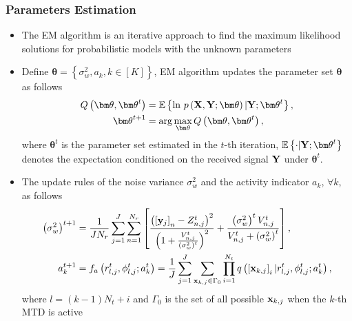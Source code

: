 \documentclass[9pt]{beamer}
\begin{document}
\begin{frame}
\frametitle{Parameters Estimation}
\begin{itemize}
\item
The EM algorithm is an iterative approach to find the maximum likelihood solutions for probabilistic models with the unknown parameters
\item
Define ${\bm \theta}=\left\{{\sigma_w^2, a_k, k\in[K]}\right\}$, EM algorithm updates the parameter set ${\bm \theta}$ as follows
\begin{align}
\label{eq:EM1} Q\left({{\bm \theta},{\bm \theta}^t}\right)&=\mathbb{E}\left\{{{\rm ln}~p\left({{\bf X, Y;{\bm \theta}}}\right)|{\bf Y};{\bm \theta}^t}\right\},\\
\label{eq:EM2} {\bm \theta}^{t+1}&={\rm arg}\max\limits_{{\bm \theta}}Q\left({{\bm \theta},{\bm \theta}^t}\right),
\end{align}
where ${\bm \theta}^t$ is the parameter set estimated in the $t$-th iteration, $\mathbb{E}\left\{{\cdot|{\bf Y};{\bm \theta}^t}\right\}$ denotes the expectation conditioned on the received signal ${\bf Y}$ under ${\bm \theta}^t$.
\item
The update rules of the noise variance $\sigma_w^2$ and the activity indicator $a_k$, $\forall k$, as follows
\begin{align}
\label{eq:EMnoiseVar}\left({\sigma_w^2}\right)^{t+1}&=\dfrac{1}{JN_r}\sum\limits_{j=1}^{J}\sum\limits_{n=1}^{N_r}\left[{\dfrac{\left({\left[{{\bf y}_j}\right]_n-Z_{n,j}^t}\right)^2}{\left({1+\frac{V_{n,j}^t}{\left({\sigma_w^2}\right)^t}}\right)^2}+\dfrac{\left({\sigma_w^2}\right)^t V_{n,j}^t}{V_{n,j}^t+\left({\sigma_w^2}\right)^t}}\right],\\
\label{eq:EMactivityIndica} a_k^{t+1}&=f_a\left({r_{l,j}^t,\phi_{l,j}^t;a_k^t}\right)
=\dfrac{1}{J}\sum\limits_{j=1}^{J}\sum\limits_{{\bf x}_{k,j}\in \Gamma_0}\prod\limits_{i=1}^{N_t}q\left({\left[{{\bf x}_{k,j}}\right]_i|r_{l,j}^t, \phi_{l,j}^t;a_k^t}\right),
\end{align}
where $l=(k-1)N_t+i$ and $\Gamma_0$ is the set of all possible ${\bf x}_{k,j}$ when the $k$-th MTD is active
\end{itemize}
\end{frame}
\end{document}
